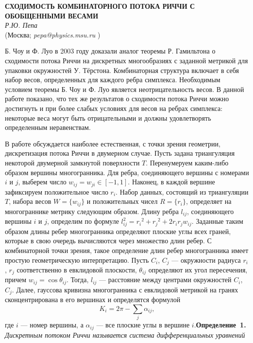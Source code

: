 \begin{center}{ \bf СХОДИМОСТЬ КОМБИНАТОРНОГО ПОТОКА РИЧЧИ С ОБОБЩЕННЫМИ ВЕСАМИ}\\
{\it Р.Ю. Пепа } \\
(Москва; {\it pepa@physics.msu.ru} )
\end{center}


Б. Чоу и Ф. Луо в 2003 году доказали аналог теоремы Р. Гамильтона о сходимости потока Риччи на дискретных многообразиях с заданной метрикой для  упаковки окружностей У. Тёрстона. Комбинаторная структура включает в себя набор весов, определенных для каждого ребра симплекса. Необходимым условием теоремы Б. Чоу и Ф. Луо является неотрицательность весов. В данной работе показано, что тех же результатов о сходимости потока Риччи можно достигнуть и при более слабых условиях для весов на ребрах симплекса: некоторые веса могут быть отрицательными и должны удовлетворять определенным неравенствам.

В работе обсуждается наиболее
естественная, с точки
зрения геометрии, дискретизация потока
Риччи в двумерном случае.
Пусть задана триангуляция некоторой
двумерной замкнутой поверхности $T$.
Перенумеруем каким-либо образом вершины
многогранника. Для ребра,
соединяющего вершины с номерами $i$ и $j$,
выберем число $ w_{ij} =
w_{ji} \in [-1,1]$. Наконец, в каждой вершине
зафиксируем
положительное число $r_i$. Набор данных,
состоящий из триангуляции
$T$, набора весов $W = \{ w_{ij} \}$ и положительных чисел
$R = \{ r_i \}$, определяет на многограннике
метрику следующим
образом. Длину ребра $l_{ij}$, соединяющего
вершины $i$ и $j$,
определим по формуле $l_{ij}^2 = {r_i}^2 + {r_j}^2 +
2r_i
r_jw_{ij}$. Заданные таким образом длины
ребер многогранника
определяют плоские углы всех граней, которые в свою очередь вычисляются через множество длин ребер.
С комбинаторной точки зрения, такое определение длин ребер многогранника имеет простую геометрическую интерпретацию. Пусть  $C_i$, $C_j$ --- окружности радиуса $r_i$, $r_j$ соответственно  в евклидовой плоскости, $ \theta_{ij} $ определяют их угол пересечения, причем $ w_{ij} = \cos \theta_{ij} $. Тогда, $l_{ij}$ --- расстояние между центрами окружностей $C_i$, $C_j$.
Далее, гауссова кривизна многогранника с
евклидовой метрикой на
гранях сконцентрирована в его вершинах и
определятся формулой
$$
K_i = 2 \pi - \sum_{j} \alpha_{ij},
$$
где $i$ --- номер вершины, а $\alpha_{ij}$ --- все
плоские углы в
вершине $i$.\textbf{Определение~1.} {\it
Дискретным потоком Риччи называется
система дифференциальных уравнений}

